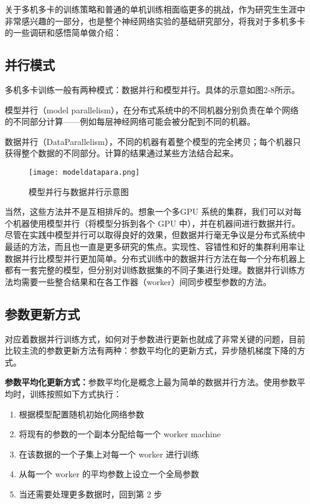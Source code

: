 关于多机多卡的训练策略和普通的单机训练相面临更多的挑战，作为研究生生涯中非常感兴趣的一部分，也是整个神经网络实验的基础研究部分，将我对于多机多卡的一些调研和感悟简单做介绍：
\subsection{并行模式}
多机多卡训练一般有两种模式：数据并行和模型并行。具体的示意如图2-8所示。

模型并行（model parallelism），在分布式系统中的不同机器分别负责在单个网络的不同部分计算——例如每层神经网络可能会被分配到不同的机器。

数据并行（DataParallelism），不同的机器有着整个模型的完全拷贝；每个机器只获得整个数据的不同部分。计算的结果通过某些方法结合起来。
\begin{figure}[!ht]
 \centering
	\texttt{[image: modeldatapara.png]}
	\caption{模型并行与数据并行示意图}
\end{figure}

当然，这些方法并不是互相排斥的。想象一个多GPU 系统的集群，我们可以对每个机器使用模型并行（将模型分拆到各个 GPU 中），并在机器间进行数据并行。
尽管在实践中模型并行可以取得良好的效果，但数据并行毫无争议是分布式系统中最适的方法，而且也一直是更多研究的焦点。实现性、容错性和好的集群利用率让数据并行比模型并行更加简单。分布式训练中的数据并行方法在每一个分布机器上都有一套完整的模型，但分别对训练数据集的不同子集进行处理。数据并行训练方法均需要一些整合结果和在各工作器（worker）间同步模型参数的方法。

\subsection{参数更新方式}
对应着数据并行训练方式，如何对于参数进行更新也就成了非常关键的问题，目前比较主流的参数更新方法有两种：参数平均化的更新方式，异步随机梯度下降的方式。

\textbf{参数平均化更新方式：}参数平均化是概念上最为简单的数据并行方法。使用参数平均时，训练按照如下方式执行：
\begin{enumerate}
\item 根据模型配置随机初始化网络参数
\item 将现有的参数的一个副本分配给每一个 worker machine
\item 在该数据的一个子集上对每一个 worker 进行训练
\item 从每一个 worker 的平均参数上设立一个全局参数
\item 当还需要处理更多数据时，回到第 2 步
\end{enumerate}

